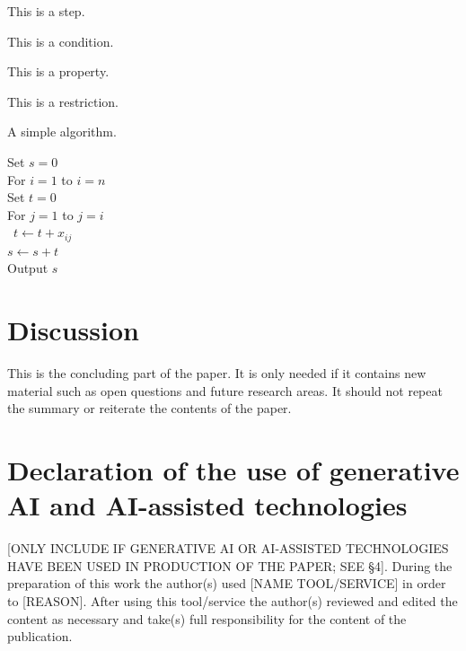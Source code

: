 \documentclass[lineno]{biometrika}
\begin{document}
\begin{step}
This is a step.
\end{step}

\begin{condition}
This is a condition.
\end{condition}


\begin{property}
This is a property.
\end{property}

\begin{restrictions}
This is a restriction.
\end{restrictions}

\begin{algo}
A simple algorithm.
\begin{tabbing}
   \qquad \enspace Set $s=0$\\
   \qquad \enspace For $i=1$ to $i=n$ \\
   \qquad \qquad Set $t=0$\\
   \qquad \qquad For $j=1$ to $j=i$ \\\
  \qquad \qquad\qquad  $t \leftarrow t + x_{ij}$ \\
\qquad \qquad $s \leftarrow s + t$ \\
\qquad \enspace Output $s$
\end{tabbing}
\end{algo}




\section{Discussion}

This is the concluding part of the paper.  It is only needed if it contains new material such as open questions and future research areas.
It  should not repeat the summary or reiterate the contents of the paper.


\section*{Declaration of the use of generative AI and AI-assisted technologies}

[ONLY INCLUDE IF GENERATIVE AI OR AI-ASSISTED TECHNOLOGIES HAVE BEEN USED IN PRODUCTION OF THE PAPER; SEE \S 4]. During the preparation of this work the author(s) used [NAME TOOL/SERVICE] in order to [REASON]. After using this tool/service the author(s) reviewed and edited the content as necessary and take(s) full responsibility for the content of the publication.
\end{document}
